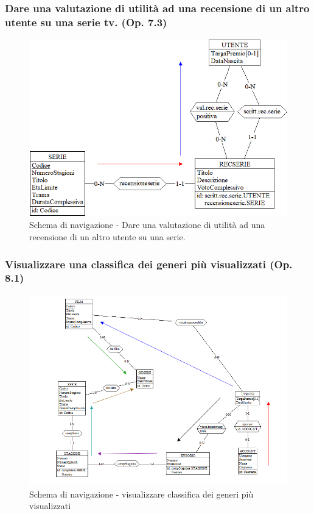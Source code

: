 \documentclass[a4paper,12pt]{report}
\begin{document}
	\subsubsection{Dare una valutazione di utilità ad una recensione di un altro utente su una serie tv. (Op. 7.3)}
	\begin{figure}[H]
		\centering
		\includegraphics[width=450pt]{ER/navigazione/valutazionerecserie.png}
		\caption{Schema di navigazione - Dare una valutazione di utilità ad una recensione di un altro utente su una serie.}
	\end{figure}
	
	\subsubsection{Visualizzare una classifica dei generi più visualizzati (Op. 8.1)}
	\begin{figure}[H]
		\centering
		\includegraphics[width=450pt]{ER/navigazione/classificageneri.png}
		\caption{Schema di navigazione - visualizzare classifica dei generi più visualizzati}
	\end{figure}	
	
\end{document}
